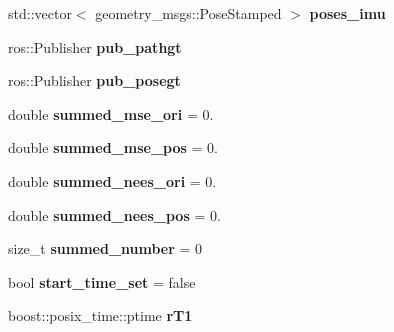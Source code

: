 \begin{DoxyCompactItemize}
std\+::vector$<$ geometry\+\_\+msgs\+::\+Pose\+Stamped $>$ {\bfseries poses\+\_\+imu}
\item 
\mbox{\label{classov__msckf_1_1ROS1Visualizer_ab3ce514ebd02e78b1392e6d3aa29c36d}} 
ros\+::\+Publisher {\bfseries pub\+\_\+pathgt}
\item 
\mbox{\label{classov__msckf_1_1ROS1Visualizer_ab27ccdde411af650b7dd659b438d5bdb}} 
ros\+::\+Publisher {\bfseries pub\+\_\+posegt}
\item 
\mbox{\label{classov__msckf_1_1ROS1Visualizer_a7ba75a96debc8e5c0248b502074c800d}} 
double {\bfseries summed\+\_\+mse\+\_\+ori} = 0.
\item 
\mbox{\label{classov__msckf_1_1ROS1Visualizer_aabd97043eccbd6f07775128cb13c9b2a}} 
double {\bfseries summed\+\_\+mse\+\_\+pos} = 0.
\item 
\mbox{\label{classov__msckf_1_1ROS1Visualizer_aa713b52731b39e47ee89be5368031863}} 
double {\bfseries summed\+\_\+nees\+\_\+ori} = 0.
\item 
\mbox{\label{classov__msckf_1_1ROS1Visualizer_aba6715cf80a85c93d0e3e1afc369ada0}} 
double {\bfseries summed\+\_\+nees\+\_\+pos} = 0.
\item 
\mbox{\label{classov__msckf_1_1ROS1Visualizer_a5c0408bcf3145d3374be11f6c9375c81}} 
size\+\_\+t {\bfseries summed\+\_\+number} = 0
\item 
\mbox{\label{classov__msckf_1_1ROS1Visualizer_a2d9be2275c26f76c8dc534c9b7401a8f}} 
bool {\bfseries start\+\_\+time\+\_\+set} = false
\item 
\mbox{\label{classov__msckf_1_1ROS1Visualizer_a65dda57aa5b8a6ce70c95494bd08584c}} 
boost\+::posix\+\_\+time\+::ptime {\bfseries r\+T1}
\item 
\mbox{\label{classov__msckf_1_1ROS1Visualizer_a02d1f6f4e4f348ac197693bedf559802}} 

\end{DoxyCompactItemize}
